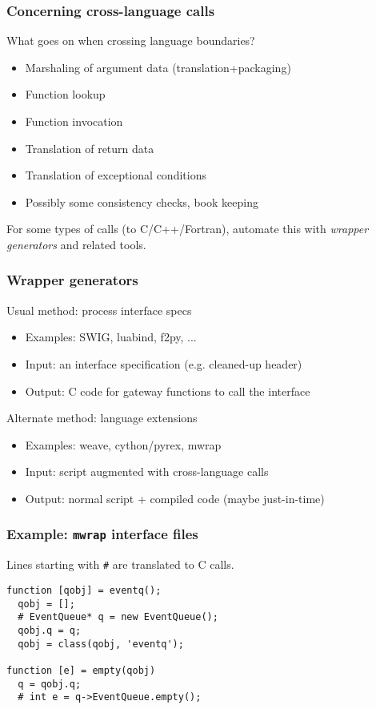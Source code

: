 \documentclass{beamer}
\begin{document}
\begin{frame}
  \frametitle{Concerning cross-language calls}
  
  What goes on when crossing language boundaries?
  \begin{itemize}
  \item Marshaling of argument data (translation+packaging)
  \item Function lookup
  \item Function invocation
  \item Translation of return data
  \item Translation of exceptional conditions
  \item Possibly some consistency checks, book keeping
  \end{itemize}

  For some types of calls (to C/C++/Fortran), automate this
  with {\em wrapper generators} and related tools.
\end{frame}


\begin{frame}
  \frametitle{Wrapper generators}

  Usual method: process interface specs
  \begin{itemize}
  \item Examples: SWIG, luabind, f2py, ...
  \item Input: an interface specification (e.g. cleaned-up header)
  \item Output: C code for gateway functions to call the interface
  \end{itemize}

  \vspace{5mm}
  Alternate method: language extensions
  \begin{itemize}
  \item Examples: weave, cython/pyrex, mwrap
  \item Input: script augmented with cross-language calls
  \item Output: normal script + compiled code (maybe just-in-time)
  \end{itemize}
\end{frame}


\begin{frame}[fragile]
  \frametitle{Example: {\tt mwrap} interface files}

Lines starting with \verb|#| are translated to C calls.
\begin{lstlisting}
function [qobj] = eventq();
  qobj = [];
  # EventQueue* q = new EventQueue();
  qobj.q = q;
  qobj = class(qobj, 'eventq');

function [e] = empty(qobj)
  q = qobj.q;
  # int e = q->EventQueue.empty();
\end{lstlisting}

\end{frame}
\end{document}
